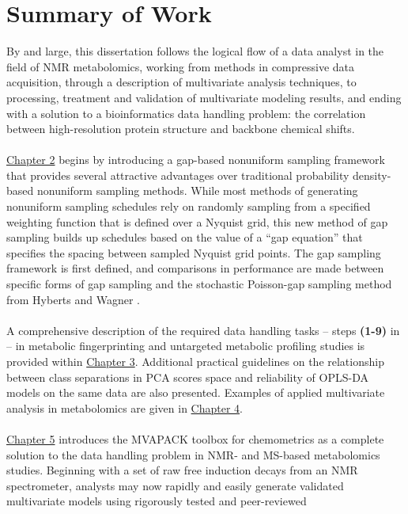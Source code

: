 \section{Summary of Work}

\begin{doublespace}
By and large, this dissertation follows the logical flow of a data analyst
in the field of NMR metabolomics, working from methods in compressive data
acquisition, through a description of multivariate analysis techniques, to
processing, treatment and validation of multivariate modeling results, and
ending with a solution to a bioinformatics data handling problem: the
correlation between high-resolution protein structure and backbone chemical
shifts.
\\\\
\hyperlink{chapter.2}{Chapter 2} begins by introducing a gap-based nonuniform
sampling framework that provides several attractive advantages over traditional
probability density-based nonuniform sampling methods. While most methods of
generating nonuniform sampling schedules rely on randomly sampling from a
specified weighting function that is defined over a Nyquist grid, this new
method of gap sampling builds up schedules based on the value of a ``gap
equation'' that specifies the spacing between sampled Nyquist grid points.
The gap sampling framework is first defined, and comparisons in performance
are made between specific forms of gap sampling and the stochastic Poisson-gap
sampling method from Hyberts and Wagner \cite{hyberts:jacs2010}.
\\\\
A comprehensive description of the required data handling tasks -- steps
{\bf (1-9)} in  -- in metabolic fingerprinting and
untargeted metabolic profiling studies is provided within
\hyperlink{chapter.3}{Chapter 3}. Additional practical guidelines on the
relationship between class separations in PCA scores space and reliability
of OPLS-DA models on the same data are also presented. Examples of applied
multivariate analysis in metabolomics are given in
\hyperlink{chapter.4}{Chapter 4}.
\\\\
\hyperlink{chapter.5}{Chapter 5} introduces the MVAPACK toolbox for
chemometrics as a complete solution to the data handling problem in NMR-
and MS-based metabolomics studies. Beginning with a set of raw free induction
decays from an NMR spectrometer, analysts may now rapidly and easily generate
validated multivariate models using rigorously tested and peer-reviewed

\end{doublespace}
